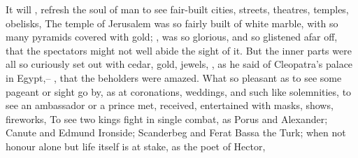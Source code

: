 {It will , refresh the soul of man to see fair-built cities, streets, theatres, temples, obelisks, \etc{} The temple of Jerusalem was so fairly built of white marble, with so many pyramids covered with gold; , was so glorious, and so glistened afar off, that the spectators might not well abide the sight of it. But the inner parts were all so curiously set out with cedar, gold, jewels, \etc{}, as he said of Cleopatra's palace in Egypt,-- , that the beholders were amazed. What so pleasant as to see some pageant or sight go by, as at coronations, weddings, and such like solemnities, to see an ambassador or a prince met, received, entertained with masks, shows, fireworks, \etc{} To see two kings fight in single combat, as Porus and Alexander; Canute and Edmund Ironside; Scanderbeg and Ferat Bassa the Turk; when not honour alone but life itself is at stake, as the poet of Hector,


}
